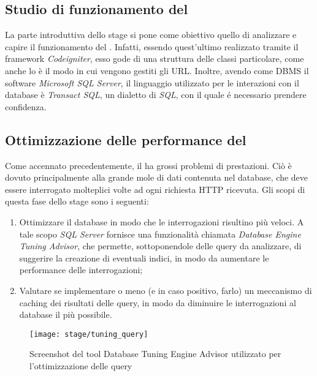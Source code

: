 \subsection{Studio di funzionamento del \bookingEngine}
La parte introduttiva dello stage si pone come obiettivo quello di analizzare e capire il funzionamento del \bookingEngine. Infatti, essendo quest'ultimo realizzato tramite il framework \textit{Codeigniter}, esso gode di una struttura delle classi particolare, come anche lo è il modo in cui vengono gestiti gli URL. Inoltre, avendo come \gls{DBMS} il software \textit{Microsoft SQL Server}, il linguaggio utilizzato per le interazioni con il database è \textit{Transact SQL}, un dialetto di \textit{SQL}, con il quale é necessario prendere confidenza.

\subsection{Ottimizzazione delle performance del \bookingEngine}
Come accennato precedentemente, il \bookingEngine ha grossi problemi di prestazioni. Ciò è dovuto principalmente alla grande mole di dati contenuta nel database, che deve essere interrogato molteplici volte ad ogni richiesta HTTP ricevuta. Gli scopi di questa fase dello stage sono i seguenti:
\begin{enumerate}
	\item Ottimizzare il database in modo che le interrogazioni risultino più veloci. A tale scopo \textit{SQL Server} fornisce una funzionalità chiamata \textit{Database Engine Tuning Advisor}, che permette, sottoponendole delle query da analizzare, di suggerire la creazione di eventuali indici, in modo da aumentare le performance delle interrogazioni;
	\item Valutare se implementare o meno (e in caso positivo, farlo) un meccanismo di caching dei risultati delle query, in modo da diminuire le interrogazioni al database il più possibile.
\end{enumerate}

\begin{figure}[!h] 
	\centering 
	\texttt{[image: stage/tuning\_query]} 
	\caption{Screenshot del tool Database Tuning Engine Advisor utilizzato per l'ottimizzazione delle query}
\end{figure}

